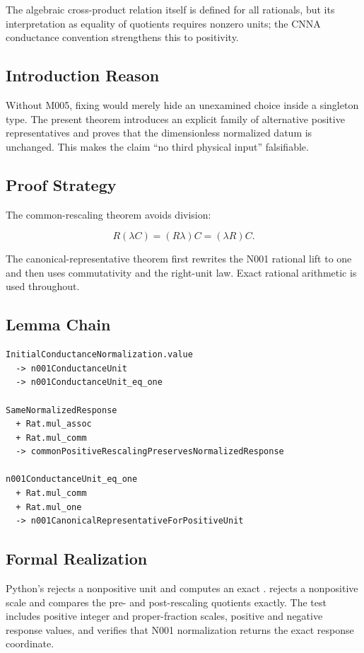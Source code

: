 The algebraic cross-product relation itself is defined for all
rationals, but its interpretation as equality of quotients requires
nonzero units; the CNNA conductance convention strengthens this to
positivity.

\subsection{Introduction Reason}\label{introduction-reason-12}

Without M005, fixing \texttt{\protect{}} would merely hide an unexamined
choice inside a singleton type. The present theorem introduces an
explicit family of alternative positive representatives and proves that
the dimensionless normalized datum is unchanged. This makes the claim
``no third physical input'' falsifiable.

\subsection{Proof Strategy}\label{proof-strategy-3}

The common-rescaling theorem avoids division:

\[
R(\lambda C)=(R\lambda)C=(\lambda R)C.
\]

The canonical-representative theorem first rewrites the N001 rational
lift to one and then uses commutativity and the right-unit law. Exact
rational arithmetic is used throughout.

\subsection{Lemma Chain}\label{lemma-chain-3}

\begin{verbatim}
InitialConductanceNormalization.value
  -> n001ConductanceUnit
  -> n001ConductanceUnit_eq_one

SameNormalizedResponse
  + Rat.mul_assoc
  + Rat.mul_comm
  -> commonPositiveRescalingPreservesNormalizedResponse

n001ConductanceUnit_eq_one
  + Rat.mul_comm
  + Rat.mul_one
  -> n001CanonicalRepresentativeForPositiveUnit
\end{verbatim}

\subsection{Formal Realization}\label{formal-realization-3}

Python's \texttt{\protect{}} rejects a nonpositive unit and
computes an exact \texttt{\protect{}}.
\texttt{\protect{}}
rejects a nonpositive scale and compares the pre- and post-rescaling
quotients exactly. The test includes positive integer and
proper-fraction scales, positive and negative response values, and
verifies that N001 normalization returns the exact response coordinate.

